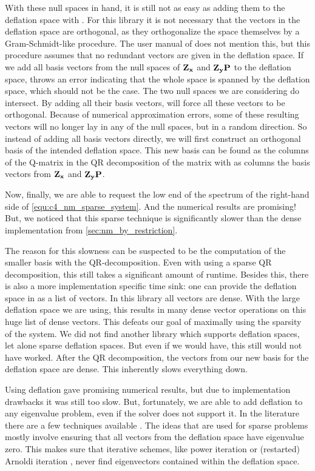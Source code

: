 With these null spaces in hand, it is still not as easy as adding them to the deflation space with \slepc{}. For this library it is not necessary that the vectors in the deflation space are orthogonal, as they orthogonalize the space themselves by a Gram-Schmidt-like procedure. The user manual of \slepc{} does not mention this, but this procedure assumes that no redundant vectors are given in the deflation space. If we add all basis vectors from the null spaces of $\vb{Z_x}$ and $\vb{Z_y}\vb{P}$ to the deflation space, \slepc{} throws an error indicating that the whole space is spanned by the deflation space, which should not be the case. The two null spaces we are considering do intersect. By adding all their basis vectors, \slepc{} will force all these vectors to be orthogonal. Because of numerical approximation errors, some of these resulting vectors will no longer lay in any of the null spaces, but in a random direction. So instead of adding all basis vectors directly, we will first construct an orthogonal basis of the intended deflation space. This new basis can be found as the columns of the Q-matrix in the QR decomposition of the matrix with as columns the basis vectors from $\vb{Z_x}$ and $\vb{Z_y} \vb{P}$.

Now, finally, we are able to request the low end of the spectrum of the right-hand side of \eqref{equ:c4_nm_sparse_system}. And the numerical results are promising! But, we noticed that this sparse technique is significantly slower than the dense implementation from \ref{sec:nm_by_restriction}.

The reason for this slowness can be suspected to be the computation of the smaller basis with the QR-decomposition. Even with using a sparse QR decomposition, this still takes a significant amount of runtime. Besides this, there is also a more implementation specific time sink: one can provide the deflation space in \slepc{} as a list of vectors. In this library all vectors are dense. With the large deflation space we are using, this results in many dense vector operations on this huge list of dense vectors. This defeats our goal of maximally using the sparsity of the system. We did not find another library which supports deflation spaces, let alone sparse deflation spaces. But even if we would have, this still would not have worked. After the QR decomposition, the vectors from our new basis for the deflation space are dense. This inherently slows everything down.

Using deflation gave promising numerical results, but due to implementation drawbacks it was still too slow. But, fortunately, we are able to add deflation to any eigenvalue problem, even if the solver does not support it. In the literature there are a few techniques available \cite[section 4.2]{saad_numerical_2011}\cite{mackey_deflation_2008}. The ideas that are used for sparse problems mostly involve ensuring that all vectors from the deflation space have eigenvalue zero. This makes sure that iterative schemes, like power iteration or (restarted) Arnoldi iteration \cite{arnoldi_principle_1951}\cite[Chapter 6]{trefethen_numerical_1997}, never find eigenvectors contained within the deflation space.


